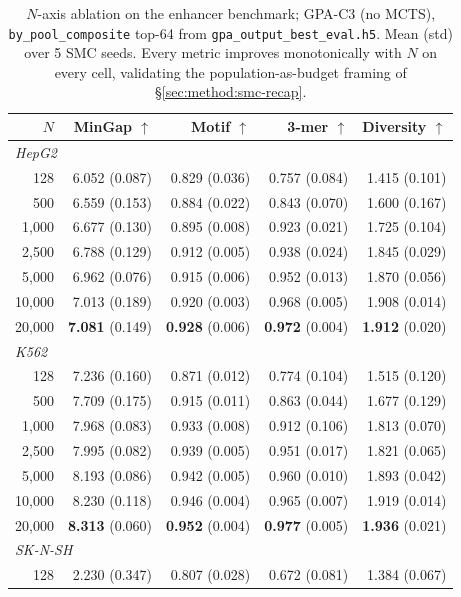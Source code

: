 \begin{table}[h]
\caption{$N$-axis ablation on the \dnacraft{} enhancer benchmark; GPA-C3 (no MCTS), \texttt{by\_pool\_composite} top-64 from \texttt{gpa\_output\_best\_eval.h5}. Mean (std) over 5 SMC seeds. Every metric improves monotonically with $N$ on every cell, validating the population-as-budget framing of \S\ref{sec:method:smc-recap}.}
\label{tab:n_sweep}
\centering
\small
\begin{tabular}{rrrrr}
\toprule
$N$ & MinGap $\uparrow$ & Motif $\uparrow$ & 3-mer $\uparrow$ & Diversity $\uparrow$ \\
\midrule
\multicolumn{5}{l}{\emph{HepG2}} \\
   128 & 6.052 (0.087) & 0.829 (0.036) & 0.757 (0.084) & 1.415 (0.101) \\
   500 & 6.559 (0.153) & 0.884 (0.022) & 0.843 (0.070) & 1.600 (0.167) \\
 1{,}000 & 6.677 (0.130) & 0.895 (0.008) & 0.923 (0.021) & 1.725 (0.104) \\
 2{,}500 & 6.788 (0.129) & 0.912 (0.005) & 0.938 (0.024) & 1.845 (0.029) \\
 5{,}000 & 6.962 (0.076) & 0.915 (0.006) & 0.952 (0.013) & 1.870 (0.056) \\
10{,}000 & 7.013 (0.189) & 0.920 (0.003) & 0.968 (0.005) & 1.908 (0.014) \\
20{,}000 & \textbf{7.081} (0.149) & \textbf{0.928} (0.006) & \textbf{0.972} (0.004) & \textbf{1.912} (0.020) \\
\midrule
\multicolumn{5}{l}{\emph{K562}} \\
   128 & 7.236 (0.160) & 0.871 (0.012) & 0.774 (0.104) & 1.515 (0.120) \\
   500 & 7.709 (0.175) & 0.915 (0.011) & 0.863 (0.044) & 1.677 (0.129) \\
 1{,}000 & 7.968 (0.083) & 0.933 (0.008) & 0.912 (0.106) & 1.813 (0.070) \\
 2{,}500 & 7.995 (0.082) & 0.939 (0.005) & 0.951 (0.017) & 1.821 (0.065) \\
 5{,}000 & 8.193 (0.086) & 0.942 (0.005) & 0.960 (0.010) & 1.893 (0.042) \\
10{,}000 & 8.230 (0.118) & 0.946 (0.004) & 0.965 (0.007) & 1.919 (0.014) \\
20{,}000 & \textbf{8.313} (0.060) & \textbf{0.952} (0.004) & \textbf{0.977} (0.005) & \textbf{1.936} (0.021) \\
\midrule
\multicolumn{5}{l}{\emph{SK-N-SH}} \\
   128 & 2.230 (0.347) & 0.807 (0.028) & 0.672 (0.081) & 1.384 (0.067) \\

\end{tabular}
\end{table}

